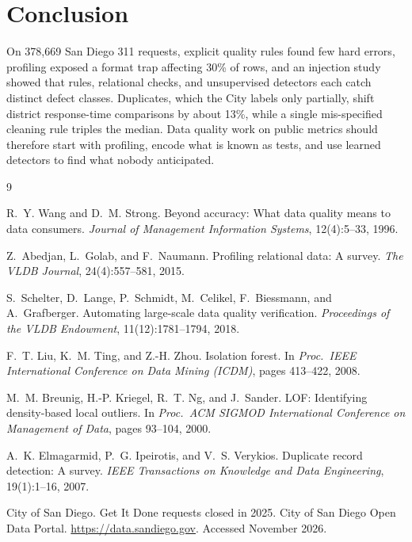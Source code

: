 \documentclass[11pt]{article}
\begin{document}
\section{Conclusion}

On 378,669 San Diego 311 requests, explicit quality rules found few hard errors, profiling exposed a format trap affecting 30\% of rows, and an injection study showed that rules, relational checks, and unsupervised detectors each catch distinct defect classes. Duplicates, which the City labels only partially, shift district response-time comparisons by about 13\%, while a single mis-specified cleaning rule triples the median. Data quality work on public metrics should therefore start with profiling, encode what is known as tests, and use learned detectors to find what nobody anticipated.

\begin{thebibliography}{9}

R.~Y. Wang and D.~M. Strong.
Beyond accuracy: What data quality means to data consumers.
\emph{Journal of Management Information Systems}, 12(4):5--33, 1996.

Z.~Abedjan, L.~Golab, and F.~Naumann.
Profiling relational data: A survey.
\emph{The VLDB Journal}, 24(4):557--581, 2015.

S.~Schelter, D.~Lange, P.~Schmidt, M.~Celikel, F.~Biessmann, and A.~Grafberger.
Automating large-scale data quality verification.
\emph{Proceedings of the VLDB Endowment}, 11(12):1781--1794, 2018.

F.~T. Liu, K.~M. Ting, and Z.-H. Zhou.
Isolation forest.
In \emph{Proc.\ IEEE International Conference on Data Mining (ICDM)}, pages 413--422, 2008.

M.~M. Breunig, H.-P. Kriegel, R.~T. Ng, and J.~Sander.
LOF: Identifying density-based local outliers.
In \emph{Proc.\ ACM SIGMOD International Conference on Management of Data}, pages 93--104, 2000.

A.~K. Elmagarmid, P.~G. Ipeirotis, and V.~S. Verykios.
Duplicate record detection: A survey.
\emph{IEEE Transactions on Knowledge and Data Engineering}, 19(1):1--16, 2007.

City of San Diego.
Get It Done requests closed in 2025.
City of San Diego Open Data Portal.
\url{https://data.sandiego.gov}. Accessed November 2026.

\end{thebibliography}
\end{document}
